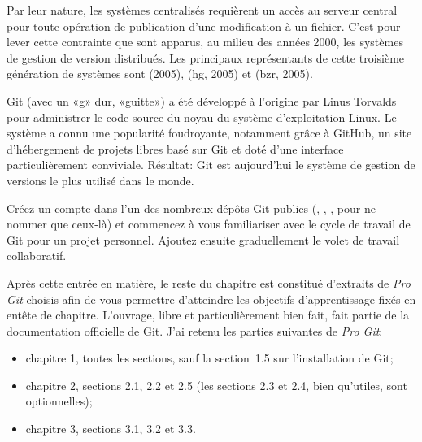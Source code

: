 Par leur nature, les systèmes centralisés requièrent un accès au
serveur central pour toute opération de publication d'une modification
à un fichier. C'est pour lever cette contrainte que sont apparus, au
milieu des années 2000, les systèmes de gestion de version distribués.
Les principaux représentants de cette troisième génération de systèmes
sont  (2005),
 (hg,
2005) et
(bzr, 2005).

Git (avec un «g» dur, «guitte») a été développé à l'origine
par Linus Torvalds pour administrer le code source du noyau du système
d'exploitation Linux. Le système a connu une popularité foudroyante,
notamment grâce à GitHub, un site d'hébergement de projets libres basé
sur Git et doté d'une interface particulièrement conviviale. Résultat:
Git est aujourd'hui le système de gestion de versions le plus utilisé
dans le monde.

Créez un compte dans l'un des nombreux dépôts Git publics
(, ,
, pour ne nommer que ceux-là) et
commencez à vous familiariser avec le cycle de travail de Git pour un
projet personnel. Ajoutez ensuite graduellement le volet de travail
collaboratif.

Après cette entrée en matière, le reste du chapitre est constitué
d'extraits de \emph{Pro Git} \citep{ProGit:2e:2014} choisis afin de
vous permettre d'atteindre les objectifs d'apprentissage fixés en
entête de chapitre. L'ouvrage, libre et particulièrement bien fait,
fait partie de la documentation officielle de Git. J'ai retenu les
parties suivantes de \emph{Pro Git}:
\begin{itemize}
\item chapitre 1, toutes les sections, sauf la section~1.5 sur
  l'installation de Git;
\item chapitre 2, sections 2.1, 2.2 et 2.5 (les sections 2.3 et 2.4,
  bien qu'utiles, sont optionnelles);
\item chapitre 3, sections 3.1, 3.2 et 3.3.
\end{itemize}


